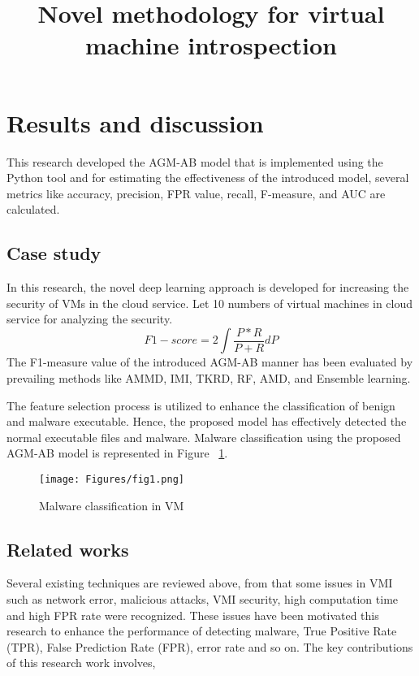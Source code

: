 \documentclass{gji}
\begin{document}
\tableofcontents
\newpage

\title{Novel methodology for virtual machine introspection}

\section{Results and discussion }
This research developed the AGM-AB model that is implemented using the Python tool and for estimating the effectiveness of the introduced model, several metrics like accuracy, precision, FPR value, recall, F-measure, and AUC are calculated.

\subsection{Case study}
In this research, the novel deep learning approach is developed for increasing the security of VMs in the cloud service. Let 10 numbers of virtual machines in cloud service for analyzing the security. 
$$
F1 - score= 2 \int \frac{P*R}{P+R}dP
$$
The F1-measure value of the introduced AGM-AB manner has been evaluated by prevailing methods like AMMD, IMI, TKRD, RF, AMD, and Ensemble learning.
\par The feature selection process is utilized to enhance the classification of benign and malware executable. Hence, the proposed model has effectively detected the normal executable files and malware. Malware classification using the proposed AGM-AB model is represented in Figure ~\ref{Figure 1:image}.
\begin{figure}
  \centering
  \texttt{[image: Figures/fig1.png]}
  \caption{Malware classification in VM}
  \label{Figure 1:image}
\end{figure}

\subsection{Related works}
Several existing techniques are reviewed above, from that some issues in VMI such as network error, malicious attacks, VMI security, high computation time and high FPR rate were recognized. These issues have been motivated this research to enhance the performance of detecting malware, True Positive Rate (TPR), False Prediction Rate (FPR), error rate and so on. The key contributions of this research work involves,
\end{document}
